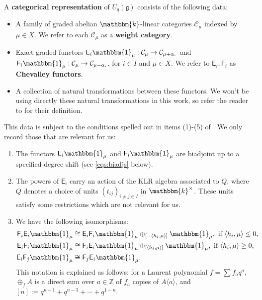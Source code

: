 \documentclass[11pt,reqno]{amsart}
\numberwithin{equation}{section}
\theoremstyle{definition}
\theoremstyle{named}
\newcommand{\cC}{\mathcal{C}}
\newcommand{\sE}{\mathsf{E}}
\newcommand{\sF}{\mathsf{F}}
\newcommand{\fg}{\mathfrak{g}}
\newcommand{\kk}{\mathbbm{k}}
\newcommand{\ZZ}{\mathbb{Z}}
\newcommand{\bone}{\mathbbm{1}}
\begin{document}
A \textbf{categorical representation} of $U_q(\fg)$ consists of the following data:
\begin{itemize}
\item A family of graded abelian $\kk$-linear categories $\cC_\mu$ indexed by $\mu \in X$.  We refer to each $\cC_\mu$ as a \textbf{weight category}. 
\item Exact graded functors $\sE_i\bone_\mu:\cC_\mu\to \cC_{\mu+\alpha_i}$ and $\sF_i\bone_\mu:\cC_\mu\to \cC_{\mu-\alpha_i}$, for $i\in I$ and $\mu\in X$. We refer to $\sE_i,\sF_i$ as \textbf{Chevalley functors}. 
\item A collection of natural transformations between these functors.  We won't be using directly these natural transformations in this work, so refer the reader to \cite[Definition 1.1]{CaLa} for their definition.
\end{itemize}
This data is subject to the conditions spelled out in items (1)-(5) of \cite[Definition 1.1]{CaLa}.  We only record those that are relevant for us:
\begin{enumerate}
\item The functors $\sE_i\bone_\mu$ and $\sF_i\bone_\mu$ are biadjoint up to a specified degree shift (see \eqref{eqs:biadjs} below).  
\item The powers of  $\sE_i$ carry an action of the KLR algebra associated to $Q$, where $Q$ denotes a choice of units $(t_{ij})_{i \neq j \in I}$ in $\mathbbm{k}^\times$.  These units satisfy some restrictions which are not relevant for us.  
\item We have the following isomorphisms:
\begin{align*}
\sF_i\sE_i\bone_\mu &\cong \sE_i\sF_i\bone_\mu\oplus_{[-\langle h_i,\mu \rangle]}\bone_\mu, \text{ if  }\langle h_i,\mu \rangle \leq 0, \\
\sE_i\sF_i\bone_\mu &\cong \sF_i\sE_i\bone_\mu\oplus_{[\langle h_i,\mu \rangle]}\bone_\mu, \text{ if  }\langle h_i,\mu \rangle \geq 0,\\
\sE_i\sF_j\bone_\mu &\cong \sF_j\sE_i\bone_\mu.
\end{align*}
This notation is explained as follows: for a Laurent polynomial $f=\sum f_a q^a$, $\oplus_f A$ is a direct sum over $a\in \ZZ$ of $f_a$ copies of $A\langle a \rangle$, and $[n]:=q^{n-1}+q^{n-3}+\cdots+q^{1-n}$.
\end{enumerate}
\end{document}
